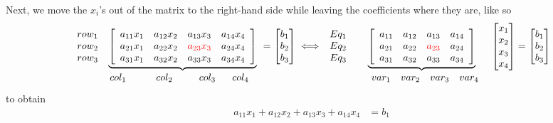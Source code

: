 \begin{tcolorbox}[sharp corners, colback=green!30, colframe=green!80!blue, title={\bf \Large From Multiple Linear Equations to Matrices and Vectors}]
Next, we move the $x_i$'s out of the matrix to the right-hand side while leaving the coefficients where they are, like so
\begin{equation}
\label{eq:3Eqns4unknowns_part03}
  \begin{array}{c}  row_1 \\ row_2\\row_3 \end{array}  \underbrace{ \left[ \begin{array}{cccc}
a_{11} x_1& a_{12}x_2 &  a_{13}x_3 & a_{14}x_4 \\
a_{21} x_1& a_{22}x_2 &  \color{red} a_{23}x_3 & a_{24}x_4 \\
a_{31} x_1& a_{32}x_2 & a_{33}x_3 & a_{34}x_4
\end{array} \right] }_{\begin{array}{cccc} col_1~~ & ~~~~col_2~~& ~~~col_3 & ~~col_4 ~~\end{array}}  = \begin{bmatrix} b_1 \\ b_2 \\b_3 \end{bmatrix} \iff \begin{array}{c}  Eq_1 \\ Eq_2\\ Eq_3 \end{array}  \underbrace{  \left[ \begin{array}{cccc}
a_{11} & a_{12} &  a_{13} & a_{14} \\
a_{21} & a_{22} &  \color{red} a_{23} & a_{24} \\
a_{31}& a_{32}& a_{33} & a_{34}
\end{array} \right] }_{\begin{array}{cccc} ~~~~var_1 & var_2& var_3 & var_4 ~~\end{array}} \begin{bmatrix}x_1 \\x_2 \\ x_3 \\ x_4 \end{bmatrix} = \begin{bmatrix} b_1 \\ b_2 \\b_3 \end{bmatrix}
\end{equation}
to obtain 
\begin{equation}
\label{eq:equiavelentLinearEquations}
\begin{aligned}
a_{11} x_1+ a_{12}x_2 + a_{13}x_3 + a_{14}x_4&=b_1 \\

\end{aligned}
\end{equation}
\end{tcolorbox}
